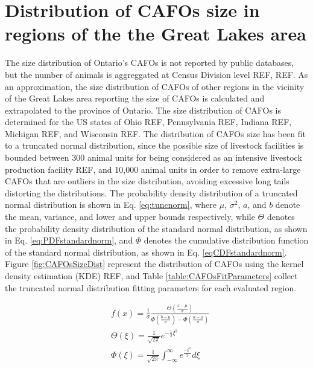 \documentclass[authoryear]{elsarticle}
\begin{document}
\section{Distribution of CAFOs size in regions of the the Great Lakes area}
The size distribution of Ontario's CAFOs is not reported by public databases, but the number of animals is aggreggated at Census Division level REF, REF. As an approximation, the size distribution of CAFOs of other regions in the vicinity of the Great Lakes area reporting the size of CAFOs is calculated and extrapolated to the province of Ontario. The size distribution of CAFOs is determined for the US states of Ohio REF, Pennsylvania REF, Indiana REF, Michigan REF, and Wisconsin REF. The distribution of CAFOs size has been fit to a truncated normal distribution, since the possible size of livestock facilities is bounded between 300 animal units for being considered as an intensive livestock production facility REF, and 10,000 animal units in order to remove extra-large CAFOs that are outliers in the size distribution, avoiding excessive long tails distorting the distributions. The probability density distribution of a truncated normal distribution is shown in Eq. \ref{eq:tuncnorm}, where $\mu$, $\sigma^2$, $a$, and $b$ denote the mean, variance, and lower and upper bounds respectively, while $\Theta$ denotes the probability density distribution of the standard normal distribution, as shown in Eq. \ref{eq:PDFstandardnorm}, and $\Phi$ denotes the cumulative distribution function of the standard normal distribution, as shown in Eq. \ref{eqCDFstandardnorm}. Figure \ref{fig:CAFOsSizeDist} represent the distribution of CAFOs using the kernel density estimation (KDE) REF, and Table \ref{table:CAFOsFitParameters} collect the truncated normal distribution fitting parameters for each evaluated region.

\begin{align}
	& f \left( x\right)  = \frac{1}{\sigma} \frac{\Theta\left(\frac{x - \mu}{\sigma} \right) }{\Phi \left( \frac {b - \mu}{\sigma}\right) - \Phi \left( \frac {a - \mu}{\sigma}\right)}\label{eq:tuncnorm}\\
	&\Theta \left( \xi \right) = \frac{1}{\sqrt{2 \pi}} e^{-\frac{1}{2}\xi^ 2} \label{eq:PDFstandardnorm}\\
	& \Phi \left( \xi \right) = \frac{1}{\sqrt{2 \pi}} \int_{-\infty}^{\infty} e^{\frac{-\xi^2}{2}} d\xi \label{eqCDFstandardnorm}
\end{align}
\end{document}
